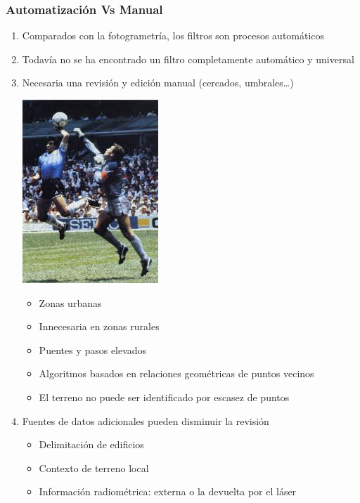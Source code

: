 \begin{frame}
  \frametitle{Automatización Vs Manual}
  \begin{enumerate}
    \item Comparados con la fotogrametría, los filtros son procesos \alert{automáticos}
    \item Todavía no se ha encontrado un filtro completamente automático y
      \alert{universal}
    \item \alert{Necesaria} una revisión y edición manual (cercados, umbrales\ldots)
        \begin{center}
        \includegraphics[height=0.60\textheight]{images/mano_dios}
        \end{center}
      \begin{itemize}
        \item Zonas urbanas 
        \item \alert{Innecesaria en zonas rurales}
        \item Puentes y pasos elevados
        \item Algoritmos basados en relaciones geométricas de puntos vecinos
        \item El terreno no puede ser identificado por escasez de puntos
      \end{itemize}
    \item Fuentes de datos adicionales pueden disminuir la revisión
      \begin{itemize}
        \item Delimitación de edificios
        \item Contexto de terreno local
        \item Información radiométrica: \alert{externa} o la \alert{devuelta por
          el láser}
      \end{itemize}
  \end{enumerate}
\end{frame}
\begin{frame}
 \titlepage
\end{frame}
